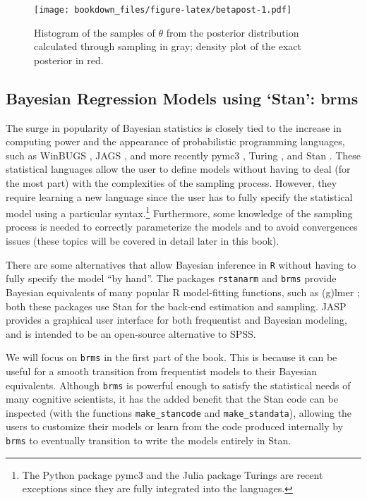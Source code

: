 \documentclass[12pt,]{krantz}
\theoremstyle{definition}
\theoremstyle{definition}
\theoremstyle{definition}
\theoremstyle{remark}
\begin{document}
\begin{figure}
\centering
\texttt{[image: bookdown\_files/figure-latex/betapost-1.pdf]}
\caption{\label{fig:betapost}Histogram of the samples of \(\theta\) from the posterior
distribution calculated through sampling in gray; density plot of the
exact posterior in red.}
\end{figure}

\subsection{\texorpdfstring{Bayesian Regression Models using `Stan':
brms}{Bayesian Regression Models using Stan: brms}}\label{bayesian-regression-models-using-stan-brms}

The surge in popularity of Bayesian statistics is closely tied to the
increase in computing power and the appearance of probabilistic
programming languages, such as WinBUGS \citep{lunn2000winbugs}, JAGS
\citep{plummer2016jags}, and more recently pymc3 \citep{Salvatier2016},
Turing \citep{turing}, and Stan \citep{carpenter2017stan}. These
statistical languages allow the user to define models without having to
deal (for the most part) with the complexities of the sampling process.
However, they require learning a new language since the user has to
fully specify the statistical model using a particular syntax.\footnote{The
  Python package pymc3 and the Julia package Turings are recent
  exceptions since they are fully integrated into the languages.}
Furthermore, some knowledge of the sampling process is needed to
correctly parameterize the models and to avoid convergences issues
(these topics will be covered in detail later in this book).

There are some alternatives that allow Bayesian inference in \texttt{R}
without having to fully specify the model ``by hand''. The packages
\texttt{rstanarm} \citep{rstanarm} and \texttt{brms} \citep{R-brms}
provide Bayesian equivalents of many popular R model-fitting functions,
such as (g)lmer \citep{lme4new}; both these packages use Stan for the
back-end estimation and sampling. JASP \citep{JASP2019} provides a
graphical user interface for both frequentist and Bayesian modeling, and
is intended to be an open-source alternative to SPSS.

We will focus on \texttt{brms} in the first part of the book. This is
because it can be useful for a smooth transition from frequentist models
to their Bayesian equivalents. Although \texttt{brms} is powerful enough
to satisfy the statistical needs of many cognitive scientists, it has
the added benefit that the Stan code can be inspected (with the
functions \texttt{make\_stancode} and \texttt{make\_standata}), allowing
the users to customize their models or learn from the code produced
internally by \texttt{brms} to eventually transition to write the models
entirely in Stan.
\end{document}
